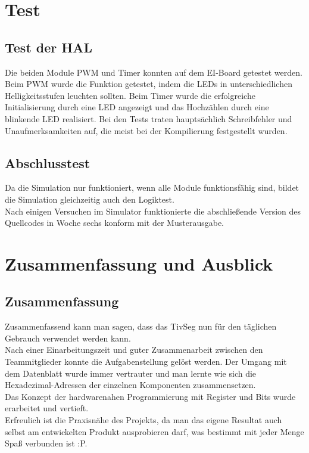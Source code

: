 \documentclass[a4paper,10pt,twoside]{report}
\newcounter{ausgabe}[chapter]
\begin{document}
\chapter{Test}

\section{Test der HAL}
Die beiden Module PWM und Timer konnten auf dem EI-Board getestet werden. Beim PWM wurde die Funktion getestet, indem die LEDs in unterschiedlichen Helligkeitsstufen leuchten sollten. Beim Timer wurde die erfolgreiche Initialisierung durch eine LED angezeigt und das Hochzählen durch eine blinkende LED realisiert.
Bei den Tests traten hauptsächlich Schreibfehler und Unaufmerksamkeiten auf, die meist bei der Kompilierung festgestellt wurden.

\section{Abschlusstest}
Da die Simulation nur funktioniert, wenn alle Module funktionsfähig sind, bildet die Simulation gleichzeitig auch den Logiktest.\\
Nach einigen Versuchen im Simulator funktionierte die abschließende Version des Quellcodes in Woche sechs konform mit der Musterausgabe.

\chapter{Zusammenfassung und Ausblick}
\section{Zusammenfassung}
Zusammenfassend kann man sagen, dass das TivSeg nun für den täglichen Gebrauch verwendet werden kann.\\ Nach einer Einarbeitungszeit und guter Zusammenarbeit zwischen den Teammitglieder konnte die Aufgabenstellung gelöst werden. Der Umgang mit dem Datenblatt wurde immer vertrauter und man lernte wie sich die Hexadezimal-Adressen der einzelnen Komponenten zusammensetzen.\\
Das Konzept der hardwarenahen Programmierung mit Register und Bits wurde erarbeitet und vertieft.\\
Erfreulich ist die Praxisnähe des Projekts, da man das eigene Resultat auch selbst am entwickelten Produkt ausprobieren darf, was bestimmt mit jeder Menge Spaß verbunden ist :P.    
\end{document}
